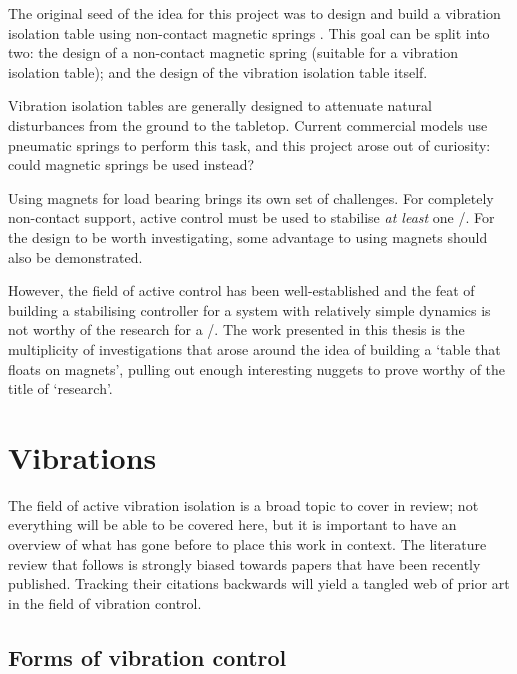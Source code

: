 \documentclass[11pt,a4paper]{memoir}
\begin{document}
The original seed of the idea for this project was to design and build a vibration isolation table using non-contact magnetic springs \parencite{hergott2001-honoursthesis}.
This goal can be split into two: the design of a non-contact magnetic spring (suitable for a vibration isolation table); and the design of the vibration isolation table itself.

Vibration isolation tables are generally designed to attenuate natural disturbances from the ground to the tabletop.
Current commercial models use pneumatic springs to perform this task, and this project arose out of curiosity: could magnetic springs be used instead?

Using magnets for load bearing brings its own set of challenges.
For completely non-contact support, active control must be used to stabilise \emph{at least} one \dof/.
For the design to be worth investigating, some advantage to using magnets should also be demonstrated.

However, the field of active control has been well-established and the feat of building a stabilising controller for a system with relatively simple dynamics is not worthy of the research for a \PhD/.
The work presented in this thesis is the multiplicity of investigations that arose around the idea of building a `table that floats on magnets', pulling out enough interesting nuggets to prove worthy of the title of `research'.





\section{Vibrations}

The field of active vibration isolation is a broad topic to cover in review; not everything will be able to be covered here, but it is important to have an overview of what has gone before to place this work in context.
The literature review that follows is strongly biased towards papers that have been recently published.
Tracking their citations backwards will yield a tangled web of prior art in the field of vibration control.

\subsection{Forms of vibration control}
\end{document}

